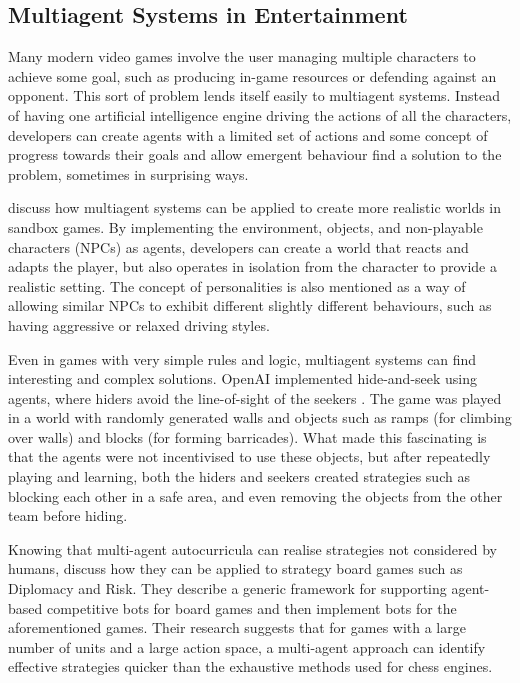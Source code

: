 \documentclass[conference]{IEEEtran}
\begin{document}
\subsection{Multiagent Systems in Entertainment}

Many modern video games involve the user managing multiple characters to achieve some goal, such as producing in-game resources or defending against an opponent. This sort of problem lends itself easily to multiagent systems. Instead of having one artificial intelligence engine driving the actions of all the characters, developers can create agents with a limited set of actions and some concept of progress towards their goals and allow emergent behaviour find a solution to the problem, sometimes in surprising ways. 

\cite{sandboxmas} discuss how multiagent systems can be applied to create more realistic worlds in sandbox games. By implementing the environment, objects, and non-playable characters (NPCs) as agents, developers can create a world that reacts and adapts the player, but also operates in isolation from the character to provide a realistic setting. The concept of personalities is also mentioned as a way of allowing similar NPCs to exhibit different slightly different behaviours, such as having aggressive or relaxed driving styles.

Even in games with very simple rules and logic, multiagent systems can find interesting and complex solutions. OpenAI implemented hide-and-seek using agents, where hiders avoid the line-of-sight of the seekers \cite{openaiemergent}. The game was played in a world with randomly generated walls and objects such as ramps (for climbing over walls) and blocks (for forming barricades). What made this fascinating is that the agents were not incentivised to use these objects, but after repeatedly playing and learning, both the hiders and seekers created strategies such as blocking each other in a safe area, and even removing the objects from the other team before hiding.

Knowing that multi-agent autocurricula can realise strategies not considered by humans, \cite{masboardgames} discuss how they can be applied to strategy board games such as Diplomacy and Risk. They describe a generic framework for supporting agent-based competitive bots for board games and then implement bots for the aforementioned games. Their research suggests that for games with a large number of units and a large action space, a multi-agent approach can identify effective strategies quicker than the exhaustive methods used for chess engines. 
\end{document}
